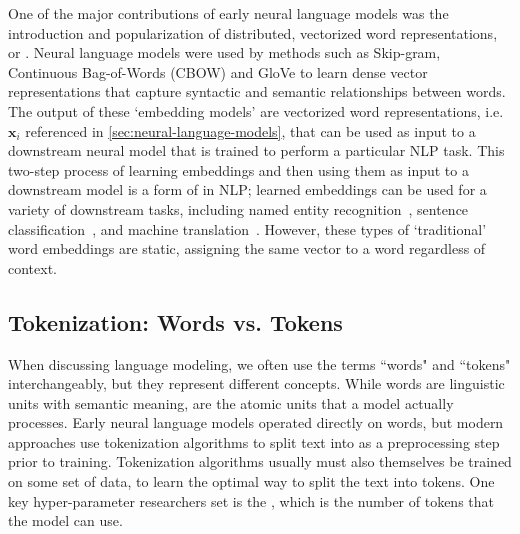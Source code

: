 One of the major contributions of early neural language models was the introduction and popularization of distributed, vectorized word representations, or . Neural language models were used by methods such as Skip-gram, Continuous Bag-of-Words (CBOW) \citep{mikolov2013efficient, mikolov2013distributed} and GloVe \citep{pennington2014glove} to learn dense vector representations that capture syntactic and semantic relationships between words. The output of these `embedding models' are vectorized word representations, i.e. $\mathbf{x}_i$ referenced in \ref{sec:neural-language-models}, that can be used as input to a downstream neural model that is trained to perform a particular NLP task. This two-step process of learning embeddings and then using them as input to a downstream model is a form of  in NLP; learned embeddings can be used for a variety of downstream tasks, including named entity recognition~\citep{lample2016neural}, sentence classification~\citep{kim2014convolutional}, and machine translation~\citep{qi2018translation}. However, these types of `traditional' word embeddings are static, assigning the same vector to a word regardless of context.


\subsection{Tokenization: Words vs. Tokens}
\label{sec:tokens-vs-words}

When discussing language modeling, we often use the terms ``words" and ``tokens" interchangeably, but they represent different concepts. While words are linguistic units with semantic meaning,  are the atomic units that a model actually processes. Early neural language models operated directly on words, but modern approaches use tokenization algorithms to split text into  as a preprocessing step prior to training. Tokenization algorithms usually must also themselves be trained on some set of data, to learn the optimal way to split the text into tokens. One key hyper-parameter researchers set is the , which is the number of tokens that the model can use.

